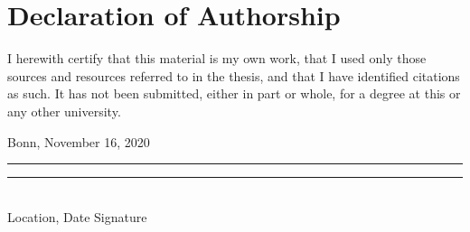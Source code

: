 \chapter{Declaration of Authorship}
\thispagestyle{empty}

\noindent%
I herewith certify that this material is my own work, that I used only those sources and
resources referred to in the thesis, and that I have identified citations as such. It has not been submitted, either in part or whole, for a degree at this or any other university.

\vfill
\noindent

Bonn, November 16, 2020 \\
\rule[1em]{14em}{0.5pt}  \hfill \rule[1em]{8em}{0.5pt}\\ %
Location, Date \hfill Signature\\


